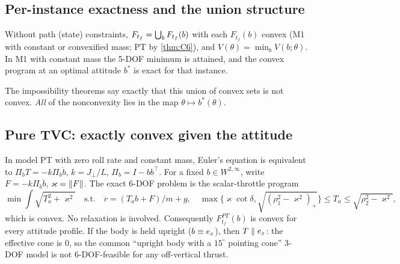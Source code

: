 \subsection{Per-instance exactness and the union structure}
\begin{theorem}\label{thm:CU}
Without path (state) constraints, $F_{t_f}=\bigcup_{b}F_{t_f}(b)$ with each $F_{t_f}(b)$ convex (M1 with constant or convexified mass; PT by \cref{thm:C6}), and
$V(\theta)=\min_bV(b;\theta)$. In M1 with constant mass the 5-DOF minimum is attained, and the convex program at an optimal
attitude $b^*$ is exact for that instance.\Sproved
\end{theorem}
The impossibility theorems say exactly that this union of convex sets is not convex. \emph{All} of the nonconvexity lies
in the map $\theta\mapsto b^*(\theta)$.

\subsection{Pure TVC: exactly convex given the attitude}
\begin{theorem}\label{thm:C6}
In model PT with zero roll rate and constant mass, Euler's equation is equivalent to $\Pi_bT=-k\Pi_b\ddot b$, $k=J_\perp/L$,
$\Pi_b=I-bb^\top$. For a fixed $b\in W^{2,\infty}$, write $F=-k\Pi_b\ddot b$, $\varkappa=\lVert F\rVert$. The exact 6-DOF problem is the
scalar-throttle program
\[
\min\int\sqrt{T_a^2+\varkappa^2}\quad\text{s.t.}\quad \ddot r=(T_ab+F)/m+g,\quad
\max\{\varkappa\cot\delta,\sqrt{(\rho_1^2-\varkappa^2)_+}\}\le T_a\le\sqrt{\rho_2^2-\varkappa^2},
\]
which is convex. No relaxation is involved. Consequently $F^{PT}_{t_f}(b)$ is convex for every attitude profile. If the body is
held upright ($b\equiv e_z$), then $T\parallel e_z$: the effective cone is $0$, so the common ``upright body with a $15^\circ$
pointing cone'' 3-DOF model is not 6-DOF-feasible for any off-vertical thrust.
\end{theorem}

